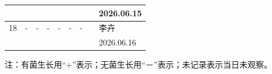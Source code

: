 \documentclass[UTF8,10pt,a4paper,fontset=fandol]{ctexart}
\newcommand{\fieldvalue}[1]{#1}
\newcommand{\handwritten}[1]{#1}
\begin{document}
\begin{center}
\begin{tabular}{|c|c|c|c|c|c|c|p{2.2cm}|p{2.8cm}|}
&
&
&
&
&
&
&
&
\fieldvalue{\handwritten{2026.06.15}}\\
\hline
\fieldvalue{\handwritten{18}} &
\fieldvalue{\handwritten{-}} &
\fieldvalue{\handwritten{-}} &
\fieldvalue{\handwritten{-}} &
\fieldvalue{\handwritten{-}} &
\fieldvalue{\handwritten{-}} &
\fieldvalue{\handwritten{-}} &
&
\fieldvalue{\handwritten{李卉}}\\[-1mm]
&
&
&
&
&
&
&
&
\fieldvalue{\handwritten{2026.06.16}}\\
\hline
\end{tabular}
\end{center}

\noindent 注：有菌生长用“+”表示；无菌生长用“－”表示；未记录表示当日未观察。
\end{document}
